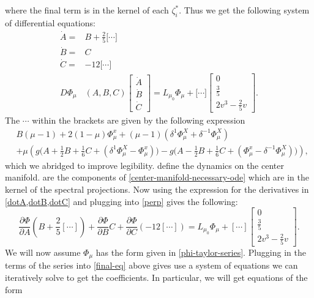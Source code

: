 where the final term is in the kernel of each \(\zeta^*_i\). Thus we get the following system of differential equations:
\begin{align}
	\dot A =& B + \frac 2 5 \Big[ \cdots \Big] \label{dotA}\\
	\dot B =& C \label{dotB}\\
	\dot C =& -12 \Big[\cdots \Big] \label{dotC} \\
	D\Phi_\mu&(A,B,C) \begin{bmatrix} \dot A \\ \dot B \\ \dot C \end{bmatrix} = L_{\mu_0} \Phi_\mu + \Big[ \cdots \Big] \begin{bmatrix} 0 \\ \frac 35 \\ 2v^3 - \frac 2 5 v \end{bmatrix} \label{perp}.
\end{align}
The \(\cdots\) within the brackets are given by the following expression
\begin{equation}\label{ellipses}
\begin{aligned}
	&B (\mu-1) + 2(1-\mu) \Phi_\mu^x + (\mu-1)(\delta^1 \Phi_\mu^X + \delta^{-1} \Phi_\mu^X) \\
	&+  \mu\left( g\big(A + \frac 1 2 B + \frac 1 6 C + (\delta^1 \Phi_\mu^X -\Phi_\mu^x)\big) - g\big(A - \frac 1 2 B + \frac 1 6 C + (\Phi_\mu^x - \delta^{-1} \Phi_\mu^X)\big) \right),
\end{aligned}
\end{equation}
which we abridged to improve legibility.  define the dynamics on the center manifold.  are the components of \cref{center-manifold-necessary-ode} which are in the kernel of the spectral projections. Now using the expression for the derivatives in \cref{dotA,dotB,dotC} and plugging into \cref{perp} gives the following:
\begin{equation}\label{final-eq}
	\frac{\partial\Phi}{\partial A}\left( B + \frac 2 5 [\cdots]\right) + \frac{\partial\Phi}{\partial B}C + \frac{\partial\Phi}{\partial C}\left(-12 [\cdots]\right) = L_{\mu_0} \Phi_\mu + [\cdots] \begin{bmatrix} 0 \\ \frac 35 \\ 2v^3 - \frac 2 5 v \end{bmatrix}.
\end{equation}
We will now assume \(\Phi_\mu\) has the form given in \cref{phi-taylor-series}. Plugging in the terms of the series into \cref{final-eq} above gives use a system of equations we can iteratively solve to get the coefficients. In particular, we will get equations of the form

